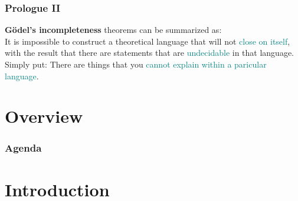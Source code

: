 \documentclass[
	11pt,
	aspectratio=169,
]{beamer}
\begin{document}
        \begin{frame}
        \frametitle{Prologue II}
        	{\textbf{Gödel's incompleteness} theorems can be summarized as: \\
        		It is impossible to construct a theoretical language that will not \textcolor{teal}{close on itself}, with the result that there are statements that are \textcolor{teal}{undecidable} in that language.} \\
        	\vspace{0.5cm}
        	{Simply put: There are things that you \textcolor{teal}{cannot explain within a paricular language}.}
        	
        \end{frame}

    \section*{Overview}
    	\begin{frame}
		\frametitle{Agenda}
    		\tableofcontents
    	\end{frame}

    \section{Introduction}
\end{document}
